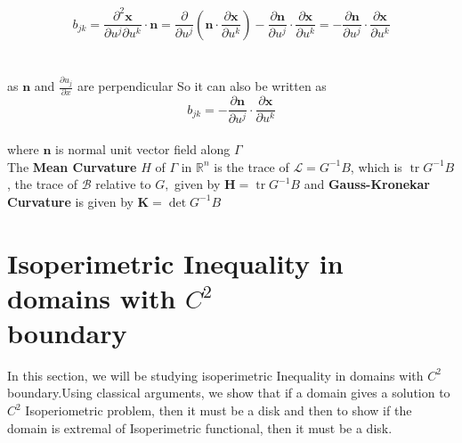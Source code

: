 \documentclass[oneside]{book}
\begin{document}
      $$b_{j k}=\frac{\partial^{2} \mathbf{x}}{\partial u^{j} \partial u^{k}} \cdot \mathbf{n}=\frac{\partial}{\partial u^{j}}\left(\mathbf{n} \cdot \frac{\partial \mathbf{x}}{\partial u^{k}}\right)-\frac{\partial \mathbf{n}}{\partial u^{j}} \cdot \frac{\partial \mathbf{x}}{\partial u^{k}}=-\frac{\partial \mathbf{n}}{\partial u^{j}} \cdot \frac{\partial \mathbf{x}}{\partial u^{k}}$$ \\\\
      
      
       as $\boldsymbol{n}$ and $\frac{\partial u_{j}}{\partial x} $ are perpendicular
      So it can also be written as 
        \begin{equation}
       b_{j k} = -\frac{\partial \mathbf{n}}{\partial u^{j}} \cdot \frac{\partial \mathbf{x}}{\partial u^{k}}         \end{equation} \\
       where $\mathbf{n}$ is normal unit vector field along $\Gamma$ \\

      
      The \textbf{Mean Curvature} $H$ of $\Gamma$ in $\mathbb{R}^{n}$ is the trace of $\mathcal{L} = G^{-1} B$, which is $\operatorname{tr} G^{-1} B$, the trace of $\mathcal{B}$ relative
to $G,$ given by
$
\boldsymbol{H}=\operatorname{tr} G^{-1} B
$ and \textbf{Gauss-Kronekar Curvature} is given by $\boldsymbol{K}=\operatorname{det} {G}^{-1} {B}$





\section{Isoperimetric Inequality in domains with $C^{2}$ \\boundary} 

In this section, we will be studying isoperimetric Inequality in domains with $C^{2}$ boundary.Using classical arguments, we show that if a domain gives a solution to $C^{2}$  Isoperiometric problem, then it must be a disk and then to show if the domain is extremal of Isoperimetric functional, then it must be a disk.
\end{document}
